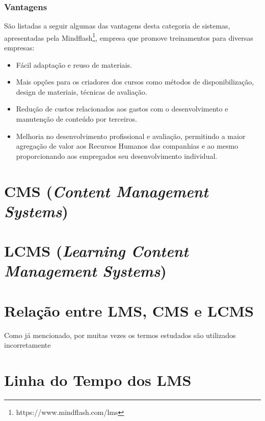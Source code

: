 \documentclass[12pt]{article}
\begin{document}
\subsubsection{Vantagens}

São listadas a seguir algumas das vantagens desta categoria de sistemas, apresentadas pela Mindflash\footnote{https://www.mindflash.com/lms}, 
empresa que promove treinamentos para diversas empresas:

\begin{itemize}
 \item Fácil adaptação e reuso de materiais.
 \item Mais opções para os criadores dos cursos como métodos de disponibilização, design de materiais, técnicas de avaliação.
 \item Redução de custos relacionados aos gastos com o desenvolvimento e manutenção de conteúdo por terceiros.
 \item Melhoria no desenvolvimento profissional e avaliação, permitindo a maior agregação de valor aos Recursos Humanos das companhias e ao mesmo 
 proporcionando aos empregados seu desenvolvimento individual.
\end{itemize}

\section{CMS (\textit{Content Management Systems})}

\section{LCMS (\textit{Learning Content Management Systems})}

\section{Relação entre LMS, CMS e LCMS}

Como já mencionado, por muitas vezes os termos estudados são utilizados incorretamente




\newpage
\appendix
\section{Linha do Tempo dos LMS}
\end{document}
